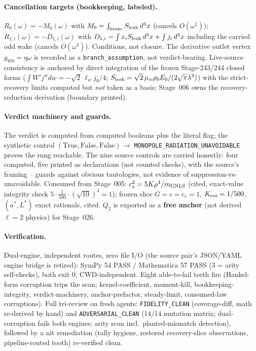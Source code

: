 \paragraph{Cancellation targets (bookkeeping, labeled).}
\(R_0(\omega)=-M_0(\omega)\) with \(M_0=\int_{\rm brane}S_{\rm leak}\,d^3x\)
(cancels \(O(\omega^1)\)); \(R_{1,i}(\omega)=-D_{1,i}(\omega)\) with
\(D_{1,i}=\int x_i S_{\rm leak}\,d^3x+\int j_i\,d^3x\) including the carried
odd wake (cancels \(O(\omega^3)\)). Conditions, not closure. The derivative
outlet vertex \(g_{W0}=\eta\omega\) is recorded as a
\texttt{branch\_assumption}, not verdict-bearing. Live-source consistency is
anchored by direct integration of the frozen Stage-243/244 closed forms
(\(\int W'j^w dw=-\sqrt2\,\ell_w j_0/4\);
\(S_{\rm leak}=\sqrt2\,\mu_w\rho_0 E_0/(2\sqrt\pi\lambda^3)\)) with the
strict-recovery limits computed but \emph{not} taken as a basis;
Stage~006 owns the recovery-reduction derivation (boundary printed).

\paragraph{Verdict machinery and guards.}
The verdict is computed from computed booleans plus the literal flag; the
synthetic control \((\mathrm{True},\mathrm{False},\mathrm{False})\to\)
\texttt{MONOPOLE\_RADIATION\_UNAVOIDABLE} proves the rung reachable. The nine
source controls are carried honestly: four computed, five printed as
declarations (not counted checks), with the source's framing -- guards
against obvious tautologies, not evidence of suppression-vs-unavoidable.
Consumed from Stage~005: \(c_s^2=5K\rho^4/m_{\rm GNLS}\) (cited, exact-value
integrity check \(5\cdot\tfrac{1}{500}\cdot(\sqrt{10})^4=1\)); frozen slice
\(G=c=c_s=1\), \(K_{\rm eos}=1/500\), \((a^*,L^*)\) exact rationals, cited.
\(Q_2\) is exported as a \textbf{free anchor} (not derived \(\ell=2\)
physics) for Stage~026.

\paragraph{Verification.}
Dual-engine, independent routes, zero file I/O (the source pair's JSON/YAML
engine bridge is retired): SymPy 54 PASS / Mathematica 57 PASS (3 = arity
self-checks), both exit 0, CWD-independent. Eight able-to-fail teeth fire
(Hankel-form corruption trips the scan; kernel-coefficient, moment-kill,
bookkeeping-integrity, verdict-machinery, anchor-prefactor, steady-limit,
consumed-law corruptions). Full tri-review on fresh agents:
\texttt{FIDELITY\_CLEAN} (coverage-diff, math re-derived by hand) and
\texttt{ADVERSARIAL\_CLEAN} (14/14 mutation matrix; dual-corruption fails
both engines; arity scan incl.\ planted-mismatch detection), followed by a
nit remediation (tally hygiene, restored recovery-slice observations,
pipeline-routed tooth) re-verified clean.

